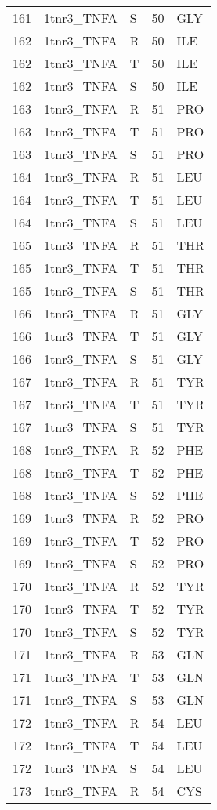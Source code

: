 \begin{longtable}[l]{l|l|l|l|l}
	161 & 1tnr3_TNFA & S & 50 & GLY \\
	162 & 1tnr3_TNFA & R & 50 & ILE \\
	162 & 1tnr3_TNFA & T & 50 & ILE \\
	162 & 1tnr3_TNFA & S & 50 & ILE \\
	163 & 1tnr3_TNFA & R & 51 & PRO \\
	163 & 1tnr3_TNFA & T & 51 & PRO \\
	163 & 1tnr3_TNFA & S & 51 & PRO \\
	164 & 1tnr3_TNFA & R & 51 & LEU \\
	164 & 1tnr3_TNFA & T & 51 & LEU \\
	164 & 1tnr3_TNFA & S & 51 & LEU \\
	165 & 1tnr3_TNFA & R & 51 & THR \\
	165 & 1tnr3_TNFA & T & 51 & THR \\
	165 & 1tnr3_TNFA & S & 51 & THR \\
	166 & 1tnr3_TNFA & R & 51 & GLY \\
	166 & 1tnr3_TNFA & T & 51 & GLY \\
	166 & 1tnr3_TNFA & S & 51 & GLY \\
	167 & 1tnr3_TNFA & R & 51 & TYR \\
	167 & 1tnr3_TNFA & T & 51 & TYR \\
	167 & 1tnr3_TNFA & S & 51 & TYR \\
	168 & 1tnr3_TNFA & R & 52 & PHE \\
	168 & 1tnr3_TNFA & T & 52 & PHE \\
	168 & 1tnr3_TNFA & S & 52 & PHE \\
	169 & 1tnr3_TNFA & R & 52 & PRO \\
	169 & 1tnr3_TNFA & T & 52 & PRO \\
	169 & 1tnr3_TNFA & S & 52 & PRO \\
	170 & 1tnr3_TNFA & R & 52 & TYR \\
	170 & 1tnr3_TNFA & T & 52 & TYR \\
	170 & 1tnr3_TNFA & S & 52 & TYR \\
	171 & 1tnr3_TNFA & R & 53 & GLN \\
	171 & 1tnr3_TNFA & T & 53 & GLN \\
	171 & 1tnr3_TNFA & S & 53 & GLN \\
	172 & 1tnr3_TNFA & R & 54 & LEU \\
	172 & 1tnr3_TNFA & T & 54 & LEU \\
	172 & 1tnr3_TNFA & S & 54 & LEU \\
	173 & 1tnr3_TNFA & R & 54 & CYS \\

\end{longtable}
